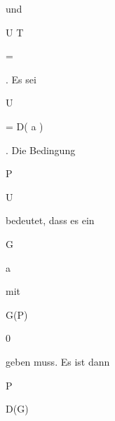 {{{    }{
}


{   }{
}


}
{}{}{}
und


\mavergleichskette


{\vergleichskette


{ U \cap T
}


{ = }{ \emptyset
}


{  }{
}


{    }{
}


{   }{
}


}
{}{}{.}
Es sei


\mavergleichskette


{\vergleichskette


{ U
}


{ = }{ D( {\mathfrak a} )
}


{  }{
}


{    }{
}


{   }{
}


}
{}{}{.}
Die Bedingung


\mavergleichskette


{\vergleichskette


{ P
}


{ \in }{ U
}


{  }{
}


{    }{
}


{   }{
}


}
{}{}{}
bedeutet, dass es ein


\mavergleichskette


{\vergleichskette


{ G
}


{ \in }{ {\mathfrak a}
}


{  }{
}


{    }{
}


{   }{
}


}
{}{}{}
mit


\mavergleichskette


{\vergleichskette


{ G(P)
}


{ \neq }{ 0
}


{  }{
}


{    }{
}


{   }{
}


}
{}{}{}
geben muss. Es ist dann


\mavergleichskette


{\vergleichskette


{ P
}


{ \in }{ D(G)
}


}}
